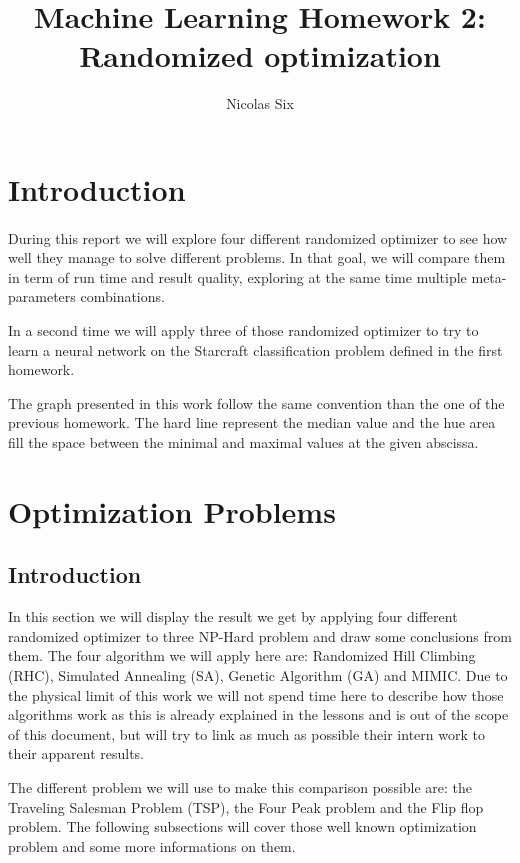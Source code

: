 \documentclass[twocolumn,a4paper,10pt]{article}
\title{Machine Learning Homework 2:\\Randomized optimization}
\author{Nicolas Six}
\begin{document}
\maketitle \tableofcontents{}

\section{Introduction}
\paragraph{}
During this report we will explore four different randomized optimizer to see how well they manage to solve different problems. In that goal, we will compare them in term of run time and result quality, exploring at the same time multiple meta-parameters combinations.

In a second time we will apply three of those randomized optimizer to try to learn a neural network on the Starcraft classification problem defined in the first homework.

The graph presented in this work follow the same convention than the one of the previous homework. The hard line represent the median value and the hue area fill the space between the minimal and maximal values at the given abscissa.

\section{Optimization Problems} \label{pb}
\subsection{Introduction}
In this section we will display the result we get by applying four different randomized optimizer to three NP-Hard problem and draw some conclusions from them. The four algorithm we will apply here are: Randomized Hill Climbing (RHC), Simulated Annealing (SA), Genetic Algorithm (GA) and MIMIC. Due to the physical limit of this work we will not spend time here to describe how those algorithms work as this is already explained in the lessons and is out of the scope of this document, but will try to link as much as possible their intern work to their apparent results.

The different problem we will use to make this comparison possible are: the Traveling Salesman Problem (TSP), the Four Peak problem and the Flip flop problem. %
The following subsections will cover those well known optimization problem and some more informations on them.
\end{document}
